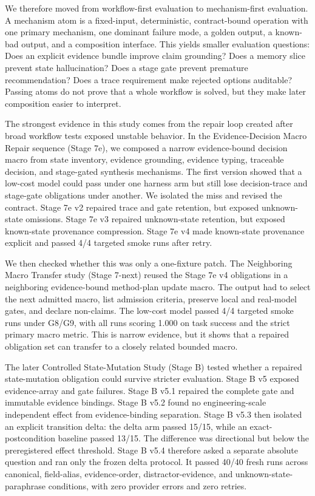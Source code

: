 \documentclass[11pt]{article}
\begin{document}
We therefore moved from workflow-first evaluation to mechanism-first evaluation. A mechanism atom is a fixed-input, deterministic, contract-bound operation with one primary mechanism, one dominant failure mode, a golden output, a known-bad output, and a composition interface. This yields smaller evaluation questions: Does an explicit evidence bundle improve claim grounding? Does a memory slice prevent state hallucination? Does a stage gate prevent premature recommendation? Does a trace requirement make rejected options auditable? Passing atoms do not prove that a whole workflow is solved, but they make later composition easier to interpret.

The strongest evidence in this study comes from the repair loop created after broad workflow tests exposed unstable behavior. In the Evidence-Decision Macro Repair sequence (Stage 7e), we composed a narrow evidence-bound decision macro from state inventory, evidence grounding, evidence typing, traceable decision, and stage-gated synthesis mechanisms. The first version showed that a low-cost model could pass under one harness arm but still lose decision-trace and stage-gate obligations under another. We isolated the miss and revised the contract. Stage 7e v2 repaired trace and gate retention, but exposed unknown-state omissions. Stage 7e v3 repaired unknown-state retention, but exposed known-state provenance compression. Stage 7e v4 made known-state provenance explicit and passed 4/4 targeted smoke runs after retry.

We then checked whether this was only a one-fixture patch. The Neighboring Macro Transfer study (Stage 7-next) reused the Stage 7e v4 obligations in a neighboring evidence-bound method-plan update macro. The output had to select the next admitted macro, list admission criteria, preserve local and real-model gates, and declare non-claims. The low-cost model passed 4/4 targeted smoke runs under G8/G9, with all runs scoring 1.000 on task success and the strict primary macro metric. This is narrow evidence, but it shows that a repaired obligation set can transfer to a closely related bounded macro.

The later Controlled State-Mutation Study (Stage B) tested whether a repaired state-mutation obligation could survive stricter evaluation. Stage B v5 exposed evidence-array and gate failures. Stage B v5.1 repaired the complete gate and immutable evidence bindings. Stage B v5.2 found no engineering-scale independent effect from evidence-binding separation. Stage B v5.3 then isolated an explicit transition delta: the delta arm passed 15/15, while an exact-postcondition baseline passed 13/15. The difference was directional but below the preregistered effect threshold. Stage B v5.4 therefore asked a separate absolute question and ran only the frozen delta protocol. It passed 40/40 fresh runs across canonical, field-alias, evidence-order, distractor-evidence, and unknown-state-paraphrase conditions, with zero provider errors and zero retries.
\end{document}

